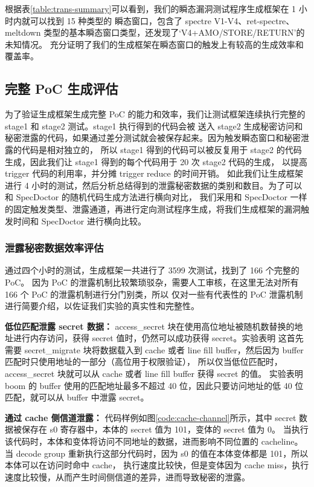 根据表\ref{table:trans-summary}可以看到，我们的瞬态漏洞测试程序生成框架在 1 小时内就可以找到 15 种类型的
瞬态窗口，包含了 spectre V1-V4、ret-spectre、meltdown 类型的基本瞬态窗口类型，还发现了‘V4+AMO/STORE/RETURN’的未知情况。
充分证明了我们的生成框架在瞬态窗口的触发上有较高的生成效率和覆盖率。\par

\subsection{完整 PoC 生成评估}

为了验证生成框架生成完整 PoC 的能力和效率，我们让测试框架连续执行完整的 stage1 和 stage2 测试。stage1 执行得到的代码会被
送入 stage2 生成秘密访问和秘密泄露的代码，如果通过差分测试就会被保存起来。因为触发瞬态窗口和秘密泄露的代码是相对独立的，
所以 stage1 得到的代码可以被反复用于 stage2 的代码生成，因此我们让 stage1 得到的每个代码用于 20 次 stage2 代码的生成，
以提高 trigger 代码的利用率，并分摊 trigger reduce 的时间开销。
如此我们让生成框架进行 4 小时的测试，然后分析总结得到的泄露秘密数据的类别和数目。为了可以和 SpecDoctor 的随机代码生成方法进行横向对比，
我们采用和 SpecDoctor 一样的固定触发类型、泄露通道，再进行定向测试程序生成，将我们生成框架的漏洞触发时间和 SpecDoctor 进行横向比较。\par

\subsubsection{泄露秘密数据效率评估}

通过四个小时的测试，生成框架一共进行了 3599 次测试，找到了 166 个完整的 PoC。
因为 PoC 的泄露机制比较繁琐驳杂，需要人工审核，在这里无法对所有 166 个 PoC 的泄露机制进行分门别类，所以
仅对一些有代表性的 PoC 泄露机制进行简要介绍，以佐证我们实验的真实性和完整性。\par

\textbf{低位匹配泄露 secret 数据：}
access\_secret 块在使用高位地址被随机数替换的地址进行内存访问，获得 secret 值时，仍然可以成功获得 secret。实验表明
这首先需要 secret\_migrate 块将数据载入到 cache 或者 line fill buffer，然后因为 buffer 匹配时只使用地址的一部分（高位用于权限验证），
所以仅当低位匹配时，access\_secret 块就可以从 cache 或者 line fill buffer 获得 secret 的值。
实验表明 boom 的 buffer 使用的匹配地址最多不超过 40 位，因此只要访问地址的低 40 位匹配，就可以从 buffer 中泄露 secret。\par

\textbf{通过 cache 侧信道泄露：}
代码样例如图\ref{code:cache-channel}所示，其中 secret 数据被保存在 s0 寄存器中，本体的 secret 值为 101，变体的 secret 值为 0。
当执行该代码时，本体和变体将访问不同地址的数据，进而影响不同位置的 cacheline。
当 decode group 重新执行这部分代码时，因为 s0 的值在本体变体都是 101，所以本体可以在访问时命中 cache，
执行速度比较快，但是变体因为 cache miss，执行速度比较慢，从而产生时间侧信道的差异，进而导致秘密的泄露。\par

